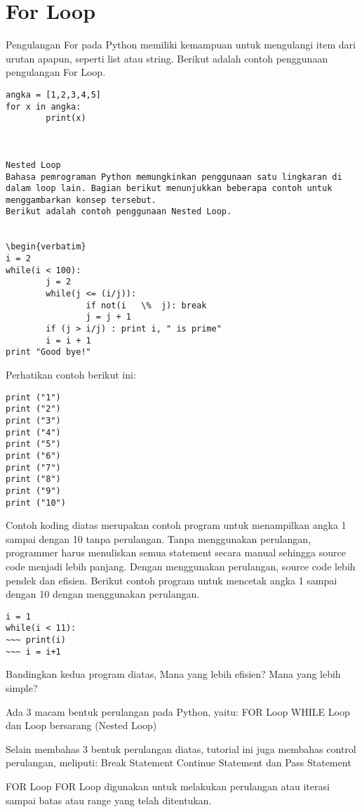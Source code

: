 \section {For Loop} 
Pengulangan For pada Python memiliki kemampuan untuk mengulangi item dari urutan apapun, seperti   list atau string. 
Berikut adalah contoh penggunaan pengulangan For Loop. 
\begin {verbatim}
angka = [1,2,3,4,5] 
for x in angka: 
        print(x)
		
		
		
Nested Loop 
Bahasa pemrograman Python memungkinkan penggunaan satu lingkaran di dalam loop lain. Bagian berikut menunjukkan beberapa contoh untuk menggambarkan konsep tersebut.   
Berikut adalah contoh penggunaan Nested Loop. 


\begin{verbatim}
i = 2 
while(i < 100): 
        j = 2 
        while(j <= (i/j)): 
                if not(i   \%  j): break 
                j = j + 1 
        if (j > i/j) : print i, " is prime" 
        i = i + 1 
print "Good bye!" 
\end{verbatim}
Perhatikan contoh berikut ini:
\begin{verbatim}
print ("1") 
print ("2") 
print ("3") 
print ("4") 
print ("5") 
print ("6") 
print ("7") 
print ("8") 
print ("9") 
print ("10") 
\end{verbatim}

Contoh koding diatas merupakan contoh program untuk menampilkan angka 1 sampai dengan 10 tanpa perulangan. Tanpa menggunakan perulangan, programmer harus menuliskan semua statement secara manual sehingga source code menjadi lebih panjang.
Dengan menggunakan perulangan, source code lebih pendek dan efisien. 
Berikut contoh program untuk mencetak angka 1 sampai dengan 10 dengan menggunakan perulangan.

\begin{verbatim}
i = 1 
while(i < 11): 
~~~ print(i) 
~~~ i = i+1 
\end{verbatim}
Bandingkan kedua program diatas, Mana yang lebih efisien? Mana yang lebih simple?

Ada 3 macam bentuk perulangan pada Python, yaitu: 
FOR Loop 
WHILE Loop 
dan Loop bersarang (Nested Loop) 

Selain membahas 3 bentuk perulangan diatas, tutorial ini juga membahas control perulangan, meliputi: 
Break Statement 
Continue Statement 
dan Pass Statement 


FOR Loop 
FOR Loop digunakan untuk melakukan perulangan atau iterasi sampai batas atau range yang telah ditentukan.


